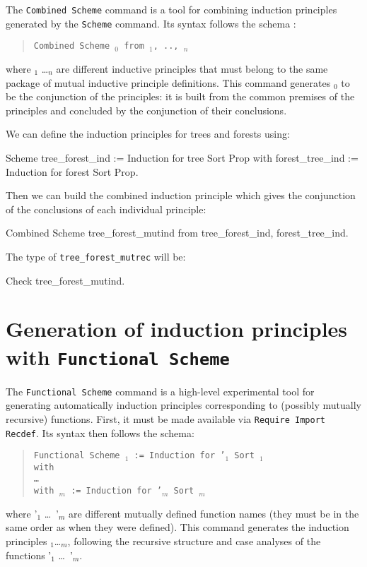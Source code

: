 The {\tt Combined Scheme} command is a tool for combining
induction principles generated by the {\tt Scheme} command.
Its syntax follows the schema :
\begin{quote}
{\tt Combined Scheme {\ident$_0$} from {\ident$_1$}, .., {\ident$_n$}}
\end{quote}
where
\ident$_1$ \ldots \ident$_n$ are different inductive principles that must belong to
the same package of mutual inductive principle definitions. This command
generates {\ident$_0$} to be the conjunction of the principles: it is
built from the common premises of the principles and concluded by the
conjunction of their conclusions.

\Example
We can define the induction principles for trees and forests using:
\begin{coq_example}
Scheme tree_forest_ind := Induction for tree Sort Prop
  with forest_tree_ind := Induction for forest Sort Prop.
\end{coq_example}

Then we can build the combined induction principle which gives the
conjunction of the conclusions of each individual principle:
\begin{coq_example}
Combined Scheme tree_forest_mutind from tree_forest_ind, forest_tree_ind.
\end{coq_example}

The type of {\tt tree\_forest\_mutrec} will be:
\begin{coq_example}
Check tree_forest_mutind.
\end{coq_example}

\section{Generation of induction principles with {\tt Functional Scheme}}
\label{FunScheme}

The {\tt Functional Scheme} command is a high-level experimental
tool for generating automatically induction principles
corresponding to (possibly mutually recursive) functions.
First, it must be made available via {\tt Require Import Recdef}.
 Its
syntax then follows the schema:
\begin{quote}
{\tt Functional Scheme {\ident$_1$} := Induction for \ident'$_1$ Sort {\sort$_1$} \\
  with\\
  \mbox{}\hspace{0.1cm} \dots\ \\
        with {\ident$_m$} := Induction for {\ident'$_m$} Sort
        {\sort$_m$}}
\end{quote}
where \ident'$_1$ \dots\ \ident'$_m$ are different mutually defined function
names (they must be in the same order as when they were defined).
This command generates the induction principles
\ident$_1$\dots\ident$_m$, following the recursive structure and case
analyses of the functions \ident'$_1$ \dots\ \ident'$_m$.


